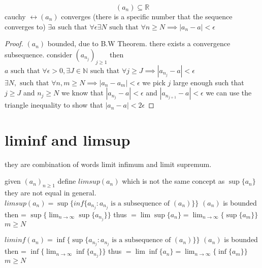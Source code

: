 \documentclass{article}
\begin{document}
\begin{theorem}
    $$(a_n) \subseteq \mathbb{R}$$
    cauchy $ \longleftrightarrow (a_n)$ converges (there is a specific number that the sequence converges to) $\exists a \text{ such that } \forall \epsilon \exists N \text{ such that } \forall n \geq N \implies |a_n - a| < \epsilon$
    
    \begin{proof}
        $(a_n)$ bounded, due to B.W Theorem. there exists a convergence subsequence.  consider $(a_{n_j})_{j \geq 1}$ then $a \text{ such that } \forall \epsilon > 0, \exists J \in \mathbb{N} \text{ such that } \forall j \geq J \implies |a_{n_j} - a| < \epsilon$     \\ 
        $\exists N, \text{ such that } \forall n, m \geq N \implies |a_n - a_m| < \epsilon$ we pick $j$ large enough such that $j \geq J$ and $n_j \geq N$ we know that $|a_{n_j} - a| < \epsilon$ and $|a_{n_{j+1}} - a| < \epsilon$ we can use the triangle inequality to show that $|a_n - a| < 2\epsilon$

    \end{proof}
\end{theorem}

\section{liminf and limsup}
they are combination of words limit  infimum and limit supremum.
\begin{definition}[Limsup]
    given $(a_n)_{n \geq 1}$ define $limsup(a_n)$ which is not the same concept as $\sup\{a_n\}$ they are not equal in general. $limsup(a_n) =  \sup \{inf\{a_{n_j} : a_{n_j} \text{ is a subsequence of } (a_n)\} \}$ 
    $(a_n)$ is bounded then = $\sup\{ \lim_{n \to \infty} \sup\{a_{n_j} \}\}$
    thus $= \lim \sup\{a_n\} = \lim_{n \to \infty} \{\sup\{a_m\}\}$ $m \geq N$ 
\end{definition}
\begin{definition}[Liminf]
    $liminf(a_n) = \inf\{ \sup\{a_{n_j} : a_{n_j} \text{ is a subsequence of } (a_n)\} \}$ 
    $(a_n)$ is bounded then = $\inf\{ \lim_{n \to \infty} \inf\{a_{n_j} \}\}$
    thus $= \lim \inf\{a_n\} = \lim_{n \to \infty} \{\inf\{a_m\}\}$ $m \geq N$
\end{definition}
\end{document}
